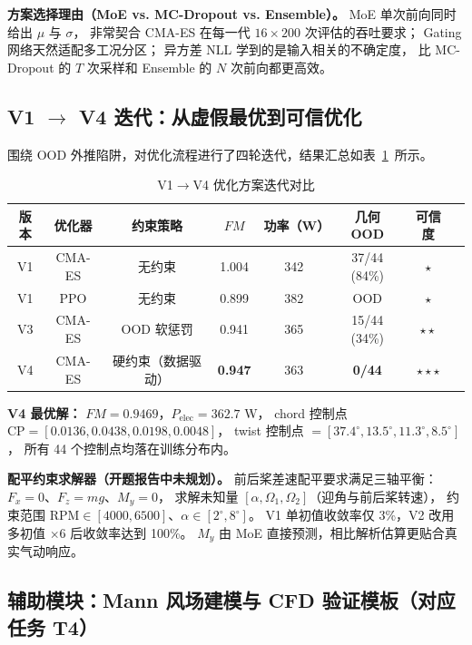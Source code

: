 \textbf{方案选择理由（MoE vs. MC-Dropout vs. Ensemble）。}
MoE 单次前向同时给出 $\mu$ 与 $\sigma$，
非常契合 CMA-ES 在每一代 $16 \times 200$ 次评估的吞吐要求；
Gating 网络天然适配多工况分区；
异方差 NLL 学到的是输入相关的不确定度，
比 MC-Dropout 的 $T$ 次采样和 Ensemble 的 $N$ 次前向都更高效。

\subsection{V1 $\rightarrow$ V4 迭代：从虚假最优到可信优化}

围绕 OOD 外推陷阱，对优化流程进行了四轮迭代，结果汇总如表~\ref{tab:v1v4}~所示。

\begin{table}[htbp]
\centering
\caption{V1$\rightarrow$V4 优化方案迭代对比}
\label{tab:v1v4}
\begin{tabular}{cccccccc}
\toprule
版本 & 优化器 & 约束策略 & $FM$ & 功率（W） & 几何 OOD & 可信度 \\
\midrule
V1 & CMA-ES & 无约束 & 1.004 & 342 & 37/44 (84\%) & $\star$ \\
V1 & PPO & 无约束 & 0.899 & 382 & OOD & $\star$ \\
V3 & CMA-ES & OOD 软惩罚 & 0.941 & 365 & 15/44 (34\%) & $\star\star$ \\
V4 & CMA-ES & 硬约束（数据驱动） & \textbf{0.947} & 363 & \textbf{0/44} & $\star\star\star$ \\
\bottomrule
\end{tabular}
\end{table}

\textbf{V4 最优解：}
$FM = 0.9469$，$P_{\text{elec}} = 362.7$ W，
chord 控制点 $\mathrm{CP} = [0.0136, 0.0438, 0.0198, 0.0048]$，
twist 控制点 $= [37.4^\circ, 13.5^\circ, 11.3^\circ, 8.5^\circ]$，
所有 44 个控制点均落在训练分布内。

\textbf{配平约束求解器（开题报告中未规划）。}
前后桨差速配平要求满足三轴平衡：$F_x = 0$、$F_z = mg$、$M_y = 0$，
求解未知量 $[\alpha, \Omega_1, \Omega_2]$（迎角与前后桨转速），
约束范围 $\text{RPM} \in [4000, 6500]$、$\alpha \in [2^\circ, 8^\circ]$。
V1 单初值收敛率仅 3\%，V2 改用多初值 $\times 6$ 后收敛率达到 100\%。
$M_y$ 由 MoE 直接预测，相比解析估算更贴合真实气动响应。

\subsection{辅助模块：Mann 风场建模与 CFD 验证模板（对应任务 T4）}

